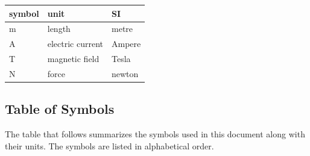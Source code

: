 \documentclass[12pt]{article}
\begin{document}
\renewcommand{\arraystretch}{1.2}
  \noindent \begin{tabular}{l l l} 
    \toprule		
    \textbf{symbol} & \textbf{unit} & \textbf{SI}\\
    \midrule 
    \si{\metre} & length & metre\\
    \si{\ampere} & electric current & Ampere\\
    \si{\tesla} & magnetic field & Tesla\\
     \si{\newton} & force & newton\\
    \bottomrule
  \end{tabular}

\subsection{Table of Symbols}

The table that follows summarizes the symbols used in this document along with
their units. The symbols are listed in alphabetical order.
\end{document}
